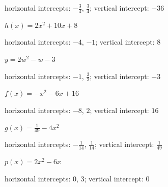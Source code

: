 \begin{solution}
 horizontal intercepts: $-\frac{3}{4}$, $\frac{3}{4}$; vertical intercept: $-36$   
\end{solution}





\begin{exercise}
$h(x)=2 x^2+10 x+8$
\end{exercise}

\begin{solution}
     horizontal intercepts: $-4$, $-1$; vertical intercept: $8$
\end{solution}





\begin{exercise}
$y=2 w^2- w-3$
\end{exercise}

\begin{solution}
     horizontal intercepts: $-1$, $\frac{3}{2}$; vertical intercept: $-3$
\end{solution}





\begin{exercise}
$f(x)=-x^2-6 x+16$
\end{exercise}

\begin{solution}
horizontal intercepts: $-8$, $2$; vertical intercept: $16$
\end{solution}





\begin{exercise}
$g(x)=\frac{1}{49}-4x^2$
\end{exercise}

\begin{solution}
 horizontal intercepts: $-\frac{1}{14}$, $\frac{1}{14}$; vertical intercept: $\frac{1}{49}$
\end{solution}





\begin{exercise}
$p(x)=2x^2-6x$
\end{exercise}

\begin{solution}
horizontal intercepts: $0$, $3$; vertical intercept: $0$
\end{solution}





